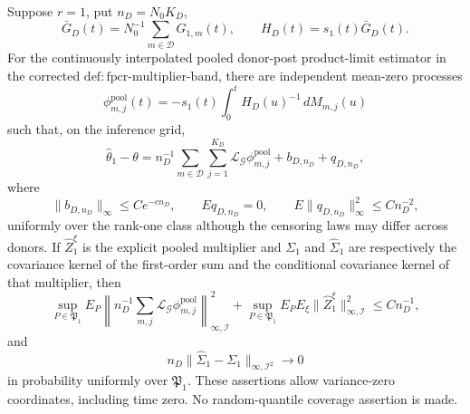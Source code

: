 Suppose \(r=1\), put \(n_D=N_0K_D\),
\[
 \bar G_D(t)=N_0^{-1}\sum_{m\in\mathcal D}G_{1,m}(t),
 \qquad H_D(t)=s_1(t)\bar G_D(t).
\]
For the continuously interpolated pooled donor-post product-limit estimator in the corrected \(\mathrm{def:fpcr\mbox{-}multiplier\mbox{-}band}\), there are independent mean-zero processes
\[
 \phi_{m,j}^{\mathrm{pool}}(t)
 =-s_1(t)\int_0^tH_D(u)^{-1}\,dM_{m,j}(u)
\]
such that, on the inference grid,
\[
 \widehat\theta_1-\theta
 =n_D^{-1}\sum_{m\in\mathcal D}\sum_{j=1}^{K_D}
 \mathcal L_{\mathcal G}\phi_{m,j}^{\mathrm{pool}}
 +b_{D,n_D}+q_{D,n_D},
\]
where
\[
 \|b_{D,n_D}\|_\infty\le Ce^{-cn_D},
 \qquad Eq_{D,n_D}=0,
 \qquad E\|q_{D,n_D}\|_\infty^2\le Cn_D^{-2},
\]
uniformly over the rank-one class although the censoring laws may differ across donors. If \(\widehat Z_1^\xi\) is the explicit pooled multiplier and \(\Sigma_1\) and \(\widehat\Sigma_1\) are respectively the covariance kernel of the first-order sum and the conditional covariance kernel of that multiplier, then
\[
 \sup_{P\in\mathfrak P_1}E_P
 \left\|n_D^{-1}\sum_{m,j}
 \mathcal L_{\mathcal G}\phi_{m,j}^{\mathrm{pool}}\right\|_
 {\infty,\mathcal I}^2
 +\sup_{P\in\mathfrak P_1}E_PE_\xi
 \|\widehat Z_1^\xi\|_{\infty,\mathcal I}^2
 \le Cn_D^{-1},
\]
and
\[
 n_D\|\widehat\Sigma_1-\Sigma_1\|_{\infty,\mathcal I^2}
 \longrightarrow0
\]
in probability uniformly over \(\mathfrak P_1\). These assertions allow variance-zero coordinates, including time zero. No random-quantile coverage assertion is made.